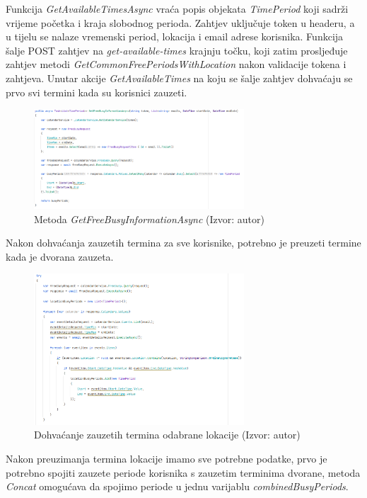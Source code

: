 \documentclass{foi}
\begin{document}
Funkcija \textit{GetAvailableTimesAsync} vraća popis objekata \textit{TimePeriod} koji sadrži vrijeme početka i kraja slobodnog perioda. Zahtjev uključuje token u headeru, a u tijelu se nalaze vremenski period, lokacija i email adrese korisnika. Funkcija šalje POST zahtjev na \textit{get-available-times} krajnju točku, koji zatim prosljeđuje zahtjev metodi \textit{GetCommonFreePeriodsWithLocation} nakon validacije tokena i zahtjeva.
Unutar akcije \textit{GetAvailableTimes} na koju se šalje zahtjev dohvaćaju se prvo svi termini kada su korisnici zauzeti.
\begin{figure}[H]
    \centering
    \includegraphics[width=0.7\textwidth]{slike/getfreebuisy.png}
    \caption{Metoda \textit{GetFreeBusyInformationAsync} (Izvor: autor)}
    \label{fig:GetFreeBusyInformationAsync}
\end{figure}
Nakon dohvaćanja zauzetih termina za sve korisnike, potrebno je preuzeti termine kada je dvorana zauzeta.
\begin{figure}[H]
    \centering
    \includegraphics[width=0.7\textwidth]{slike/GetBuisyLocation.png}
    \caption{Dohvaćanje zauzetih termina odabrane lokacije (Izvor: autor)}
    \label{fig:GetBuisyLocation}
\end{figure}
Nakon preuzimanja termina lokacije imamo sve potrebne podatke, prvo je potrebno spojiti zauzete periode korisnika s zauzetim terminima dvorane, metoda \textit{Concat} omogućava da spojimo periode u jednu varijablu \textit{combinedBusyPeriods}.
\end{document}
